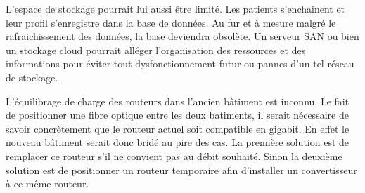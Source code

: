 L’espace de stockage pourrait lui aussi être limité. Les patients s’enchainent et leur profil s’enregistre dans la base de données. Au fur et à mesure malgré le rafraichissement des données, la base deviendra obsolète. Un serveur SAN ou bien un stockage cloud pourrait alléger l’organisation des ressources et des informations pour éviter tout dysfonctionnement futur ou pannes d’un tel réseau de stockage.

L’équilibrage de charge des routeurs dans l’ancien bâtiment est inconnu. Le fait de positionner une fibre optique entre les deux batiments, il serait nécessaire de savoir concrètement que le routeur actuel soit compatible en gigabit. En effet le nouveau bâtiment serait donc bridé au pire des cas.
La première solution est de remplacer ce routeur s’il ne convient pas au débit souhaité. Sinon la deuxième solution est de positionner un routeur temporaire afin d’installer un convertisseur à ce même routeur.

%

